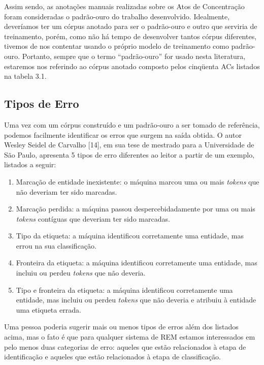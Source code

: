 \documentclass[11pt]{report}
\newcommand{\quotes}[1]{``#1''}
\begin{document}
Assim sendo, as anotações manuais realizadas sobre os Atos de Concentração foram consideradas o padrão-ouro do trabalho desenvolvido. Idealmente,
deveríamos ter um córpus anotado para ser o padrão-ouro e outro que serviria de treinamento, porém, como não há tempo de desenvolver tantos córpus diferentes, tivemos de nos
contentar usando o próprio modelo de treinamento como padrão-ouro. Portanto, sempre que o termo \quotes{padrão-ouro} for usado nesta literatura, estaremos nos referindo ao córpus
anotado composto pelos cinqüenta ACs listados na tabela 3.1.

\subsection{Tipos de Erro}

\indent\indent Uma vez com um córpus construído e um padrão-ouro a ser tomado de referência, podemos facilmente identificar os erros que surgem na saída obtida. O autor
Wesley Seidel de Carvalho [14], em sua tese de mestrado para a Universidade de São Paulo, apresenta 5 tipos de erro diferentes ao leitor a partir de um exemplo, listados a seguir:

\begin{enumerate}[label=\textbf{E\arabic*.}]
  \item Marcação de entidade inexistente: o máquina marcou uma ou mais \textit{tokens} que não deveriam ter sido marcadas.
  \item Marcação perdida: a máquina passou despercebidadamente por uma ou mais \textit{tokens} contíguas que deveriam ter sido marcadas.
  \item Tipo da etiqueta: a máquina identificou corretamente uma entidade, mas errou na sua classificação.
  \item Fronteira da etiqueta: a máquina identificou corretamente uma entidade, mas incluiu ou perdeu \textit{tokens} que não deveria.
  \item Tipo e fronteira da etiqueta: a máquina identificou corretamente uma entidade, mas incluiu ou perdeu \textit{tokens} que não deveria e atribuiu à entidade uma etiqueta errada.
\end{enumerate}

Uma pessoa poderia sugerir mais ou menos tipos de erros além
dos listados acima, mas o fato é que para qualquer sistema de REM estamos interessados em pelo menos duas categorias de erro: aqueles que estão relacionados à etapa de identificação
e aqueles que estão relacionados à etapa de classificação.
\end{document}
